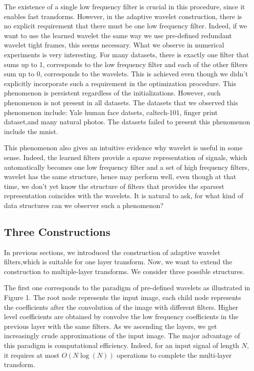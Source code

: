 \documentclass[a4paper]{article}
\begin{document}
{The existence of a single low frequency filter is crucial in this procedure, since it enables fast transforms. However, in the adaptive wavelet construction, there is no explicit requirement that there must be one low frequency filter. Indeed, if we want to use the learned wavelet the same way we use pre-defined redundant wavelet tight frames, this seems necessary. What we observe in numerical experiments is very interesting. For many datasets, there is exactly one filter that sums up to 1, corresponds to the low frequency filter and each of the other filters sum up to 0, corresponds to the wavelets. This is achieved even though we didn't explicitly incorporate such a requirement in the optimization procedure. This phenomenon is persistent regardless of the initializations. However, such phenomenon is not present in all datasets. The datasets that we observed this phenomenon include: Yale human face datsets, caltech-101, finger print dataset,and many natural photos. The datasets failed to present this phenomenon include the mnist.  

This phenomenon also gives an intuitive evidence why wavelet is useful in some sense. Indeed, the learned filters provide a sparse representation of signals, which automatically becomes one low frequency filter and a set of high frequency filters, wavelet has the same structure, hence may perform well, even though at that time, we don't yet know the structure of  filters that provides the sparsest representation coincides with the wavelets. It is natural to ask, for what kind of data structures can we observer such a phenomenon?
\subsection{Three Constructions}
In previous sections, we introduced the construction of adaptive wavelet filters,which is suitable for one layer transform. Now, we want to extend the construction to multiple-layer transforms. We consider three possible structures.

The first one corresponds to the paradigm of pre-defined wavelets as illustrated in Figure 1. The root node represents the input image, each child node represents the coefficients after the convolution of the image with different filters. Higher level coefficients are obtained by convolve the low frequency coefficients in the previous layer with the same filters. As we ascending the layers, we get increasingly crude approximations of the input image. The major advantage of this paradigm is computational efficiency. Indeed, for an input signal of length $N$, it requires at most $O(N\log(N))$ operations to complete the multi-layer transform. 

}
\end{document}
